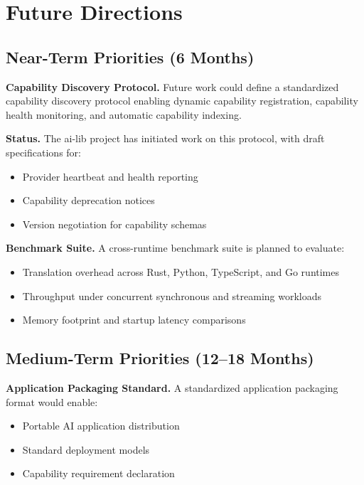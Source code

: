\section{Future Directions}

\subsection{Near-Term Priorities (6 Months)}

\textbf{Capability Discovery Protocol.} Future work could define a standardized capability discovery protocol enabling dynamic capability registration, capability health monitoring, and automatic capability indexing.

\textbf{Status.} The ai-lib project has initiated work on this protocol, with draft specifications for:
\begin{itemize}
    \item Provider heartbeat and health reporting
    \item Capability deprecation notices
    \item Version negotiation for capability schemas
\end{itemize}

\textbf{Benchmark Suite.} A cross-runtime benchmark suite is planned to evaluate:
\begin{itemize}
    \item Translation overhead across Rust, Python, TypeScript, and Go runtimes
    \item Throughput under concurrent synchronous and streaming workloads
    \item Memory footprint and startup latency comparisons
\end{itemize}

\subsection{Medium-Term Priorities (12--18 Months)}

\textbf{Application Packaging Standard.} A standardized application packaging format would enable:
\begin{itemize}
    \item Portable AI application distribution
    \item Standard deployment models
    \item Capability requirement declaration
\end{itemize}

